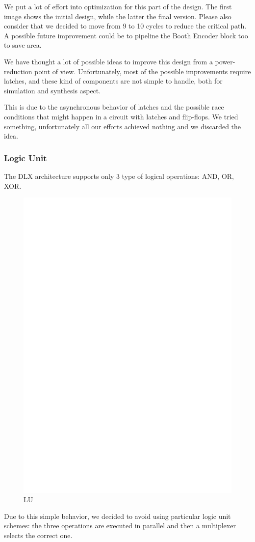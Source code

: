 \documentclass[12pt]{article}
\begin{document}
We put a lot of effort into optimization for this part of the design. The first image shows the initial design, while the latter the final version. Please also consider that we decided to move from 9 to 10 cycles to reduce the critical path.
A possible future improvement could be to pipeline the Booth Encoder block too to save area.

We have thought a lot of possible ideas to improve this design from a power-reduction point of view. Unfortunately, most of the possible improvements require latches, and these kind of components are not simple to handle, both for simulation and synthesis aspect.

This is due to the asynchronous behavior of latches and the possible race conditions that might happen in a circuit with latches and flip-flops. We tried something, unfortunately all our efforts achieved nothing and we discarded the idea.

\subsubsection{Logic Unit}
The DLX architecture supports only 3 type of logical operations: AND, OR, XOR. 
\begin{figure}[h]
	\includegraphics[center]{images/LOGIC_UNIT.eps}
	\caption{LU}
	\label{LU}
\end{figure}
Due to this simple behavior, we decided to avoid using particular logic unit schemes: the three operations are executed in parallel and then a multiplexer selects the correct one. 
\end{document}
